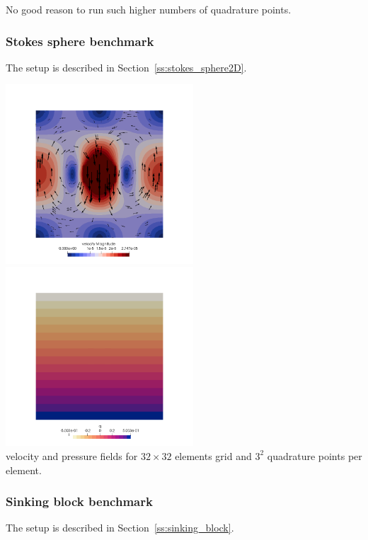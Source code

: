 No good reason to run such higher numbers of quadrature points.


\subsubsection*{Stokes sphere benchmark}

The setup is described in Section~\ref{ss:stokes_sphere2D}.

\begin{center}
\includegraphics[width=7cm]{python_codes/fieldstone_18/results/sphere/vel}
\includegraphics[width=7cm]{python_codes/fieldstone_18/results/sphere/press}\\
{\captionfont velocity and pressure fields for $32\times 32$ elements grid and $3^2$
quadrature points per element.}
\end{center}

\subsubsection*{Sinking block benchmark}

The setup is described in Section~\ref{ss:sinking_block}.

